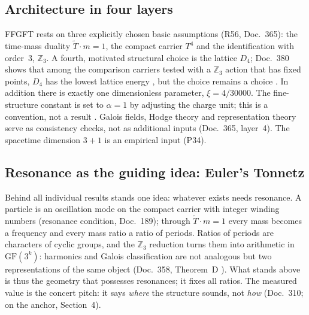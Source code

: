 \subsection{Architecture in four layers}

FFGFT rests on three explicitly chosen basic assumptions (R56, Doc.~365): the time-mass duality
$\tilde T\cdot m=1$, the compact carrier $T^4$ and the identification with order~3,
$\mathbb{Z}_3$. A fourth, motivated structural choice is the lattice $D_4$; Doc.~380 shows that
among the comparison carriers tested with a $\mathbb{Z}_3$ action that has fixed points, $D_4$ has
the lowest lattice energy \KM, but the choice remains a choice \SM. In addition there is exactly
one dimensionless parameter, $\xi=4/30000$. The fine-structure constant is set to $\alpha=1$ by
adjusting the charge unit; this is a convention, not a result \QM. Galois fields, Hodge theory
and representation theory serve as consistency checks, not as additional inputs (Doc.~365,
layer~4). The spacetime dimension $3+1$ is an empirical input (P34).

\subsection{Resonance as the guiding idea: Euler's Tonnetz}

Behind all individual results stands one idea: whatever exists needs resonance. A particle is an
oscillation mode on the compact carrier with integer winding numbers (resonance condition,
Doc.~189); through $\tilde T\cdot m=1$ every mass becomes a frequency and every mass ratio a ratio
of periods. Ratios of periods are characters of cyclic groups, and the $\mathbb{Z}_3$ reduction
turns them into arithmetic in $\mathrm{GF}(3^k)$: harmonics and Galois classification are not
analogous but two representations of the same object (Doc.~358, Theorem~D \BM). What stands
above is thus the geometry that possesses resonances; it fixes all ratios. The measured value is
the concert pitch: it says \emph{where} the structure sounds, not \emph{how} (Doc.~310; on the
anchor, Section~4).

